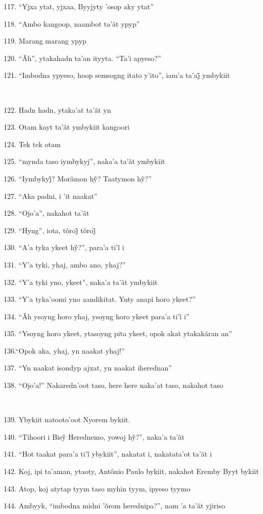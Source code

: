 117. ``Yjxa ytat, yjxaa, Byyjyty 'osop aky ytat''

118. ``Ambo kangoop, naambot ta'ãt ypyp''

119. Marang marang ypyp

120. ``Ãh'', ytakahadn ta'an ityyta. ``Ta'i apyeso?''

121. ``Imbodna ypyeso, hoop semsogng itato y’ito'', iam’a ta’aj̃ ymbykiit

~

122. Hadn hadn, ytaka'at ta'ãt yn

123. Otam kayt ta'ãt ymbykiit kangoori

124. Tek tek otam

125. ``mynda taso iymbykyj'', naka'a ta'ãt ymbykiit

126. ``Iymbykyj̃? Morãmon hỹ? Taatymon hỹ?''

127. ``Aka padni, i 'it naakat''

128. ``Ojo'a'', nakahot ta'ãt

129. ``Hyng'', iota, tõroj̃ tõroj̃

130. ``A’a tyka ykeet hỹ?'', para’a ti’ĩ i

131. ``Y'a tyki, yhaj, ambo ano, yhaj?''

132. ``Y'a tyki yno, ykeet'', naka'a ta'ãt ymbykiit

133. ``Y'a tyka'oomi yno aandikitat. Ynty anapi horo ykeet?''

134. ``Ãh ysoyng horo yhaj, ysoyng horo ykeet para’a ti’ĩ i''

135. ``Ysoyng horo ykeet, ytasoyng pita ykeet, opok akat ytakakãran an''

136.``Opok aka, yhaj, yn naakat yhaj!''

137. ``Yn naakat isondyp ajxat, yn naakat iherednan''

138. ``Ojo'a!'' Nakaredn'oot taso, here here naka'at taso, nakahot taso

~

139. Ybykiit natooto'oot Nyorem bykiit.

140. ``Tihoori i Bisỹ Herednemo, yowoj hỹ?'', naka’a ta’ãt

141. ``Hot taakat para’a ti’ĩ ybykiit'', nakatat i, nakatata’ot ta’ãt i

142. Koj, ipi ta'aman, ytaoty, Antônio Paulo bykiit, nakahot Eremby Byyt bykiit

143. Atop, koj atytap tyym taso myhin tyym, ipyeso tyymo

144. Ambyyk, ``imbodna midni 'õrom herednipa?'', nam 'a ta'ãt yjiriso


